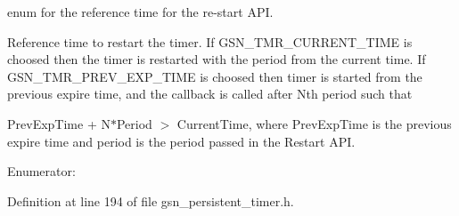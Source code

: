 enum for the reference time for the re-\/start API. 

Reference time to restart the timer. If GSN\_\-TMR\_\-CURRENT\_\-TIME is choosed then the timer is restarted with the period from the current time. If GSN\_\-TMR\_\-PREV\_\-EXP\_\-TIME is choosed then timer is started from the previous expire time, and the callback is called after Nth period such that

PrevExpTime + N$\ast$Period $>$ CurrentTime, where PrevExpTime is the previous expire time and period is the period passed in the Restart API. \begin{Desc}
\item[Enumerator: ]\par
\begin{description}
\item[{\em 
\hypertarget{a00671_gga9aa5599a087c6080868052f86ecad7dfa2ab194528197fe1eeed47e7efabb3701}{
GSN\_\-P\_\-TMR\_\-CURRENT\_\-TIME}
\label{a00671_gga9aa5599a087c6080868052f86ecad7dfa2ab194528197fe1eeed47e7efabb3701}
}]\item[{\em 
\hypertarget{a00671_gga9aa5599a087c6080868052f86ecad7dfad4c5b6ce85e5ffed6b4474dd639db19e}{
GSN\_\-P\_\-TMR\_\-PREV\_\-EXP\_\-TIME}
\label{a00671_gga9aa5599a087c6080868052f86ecad7dfad4c5b6ce85e5ffed6b4474dd639db19e}
}]\end{description}
\end{Desc}



Definition at line 194 of file gsn\_\-persistent\_\-timer.h.



